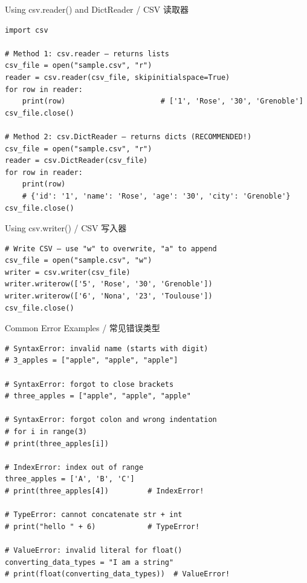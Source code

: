 \documentclass[11pt,a4paper]{report}
\begin{document}
\begin{examplebox}{Using csv.reader() and DictReader / CSV 读取器}
\begin{lstlisting}
import csv

# Method 1: csv.reader — returns lists
csv_file = open("sample.csv", "r")
reader = csv.reader(csv_file, skipinitialspace=True)
for row in reader:
    print(row)                      # ['1', 'Rose', '30', 'Grenoble']
csv_file.close()

# Method 2: csv.DictReader — returns dicts (RECOMMENDED!)
csv_file = open("sample.csv", "r")
reader = csv.DictReader(csv_file)
for row in reader:
    print(row)
    # {'id': '1', 'name': 'Rose', 'age': '30', 'city': 'Grenoble'}
csv_file.close()
\end{lstlisting}
\end{examplebox}

\begin{examplebox}{Using csv.writer() / CSV 写入器}
\begin{lstlisting}
# Write CSV — use "w" to overwrite, "a" to append
csv_file = open("sample.csv", "w")
writer = csv.writer(csv_file)
writer.writerow(['5', 'Rose', '30', 'Grenoble'])
writer.writerow(['6', 'Nona', '23', 'Toulouse'])
csv_file.close()
\end{lstlisting}
\end{examplebox}

\begin{examplebox}{Common Error Examples / 常见错误类型}
\begin{lstlisting}
# SyntaxError: invalid name (starts with digit)
# 3_apples = ["apple", "apple", "apple"]

# SyntaxError: forgot to close brackets
# three_apples = ["apple", "apple", "apple"

# SyntaxError: forgot colon and wrong indentation
# for i in range(3)
# print(three_apples[i])

# IndexError: index out of range
three_apples = ['A', 'B', 'C']
# print(three_apples[4])         # IndexError!

# TypeError: cannot concatenate str + int
# print("hello " + 6)            # TypeError!

# ValueError: invalid literal for float()
converting_data_types = "I am a string"
# print(float(converting_data_types))  # ValueError!
\end{lstlisting}
\end{examplebox}
\end{document}
